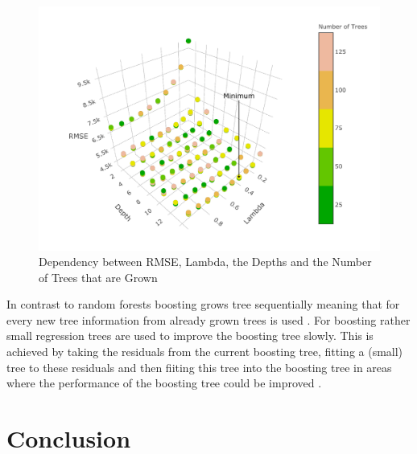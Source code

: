 \documentclass[11pt,]{article}
\begin{document}
\begin{figure}

{\centering \includegraphics{../00_data/output_paper/11_boosting_plot} 

}

\caption[RMSE's of the Boosting Model for Different Parameters]{Dependency between RMSE, Lambda, the Depths and the Number of Trees that are Grown}\label{fig:unnamed-chunk-12}
\end{figure}

In contrast to random forests boosting grows tree sequentially meaning
that for every new tree information from already grown trees is used
\autocite[p.322]{James2014}. For boosting rather small regression trees
are used to improve the boosting tree slowly. This is achieved by taking
the residuals from the current boosting tree, fitting a (small) tree to
these residuals and then fiiting this tree into the boosting tree in
areas where the performance of the boosting tree could be improved
\autocite[p.322]{James2014}.

\hypertarget{conclusion}{%
\section{Conclusion}\label{conclusion}}

\pagebreak

\printbibliography[title = References]
\cleardoublepage

\begin{refsection}
\nocite{R-base}
\nocite{R-broom}
\nocite{R-dplyr}
\nocite{R-ggplot2}
\nocite{R-haven}
\nocite{R-lmtest}
\nocite{R-PerformanceAnalytics}
\nocite{R-rstudioapi}
\nocite{R-sandwich}
\nocite{R-stargazer}
\nocite{R-svMisc}
\nocite{R-tidyr}
\nocite{R-xts}
\nocite{R-Studio}
\printbibliography[title = Software-References]
\end{refsection}
\end{document}

